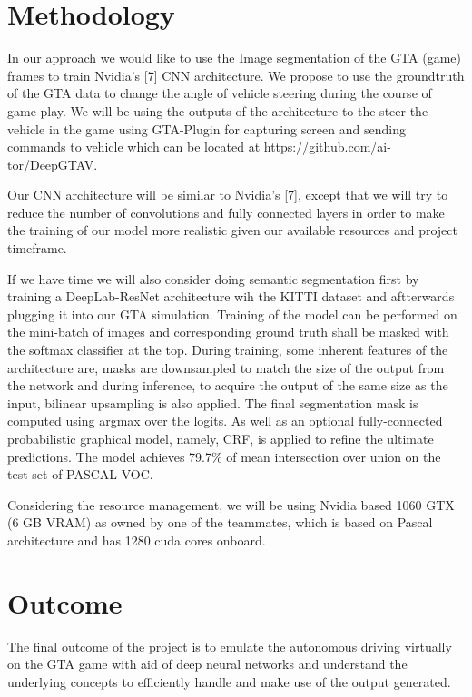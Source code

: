 \documentclass[10pt,twocolumn,letterpaper]{article}
\begin{document}
	\section{Methodology}
	In our approach we would like to use the Image segmentation of the GTA (game) frames to train Nvidia's [7] CNN architecture. We propose to use the groundtruth of the GTA data to change the angle of vehicle steering during the course of game play. We will be using the outputs of the architecture to the steer the vehicle in the game using GTA-Plugin for capturing screen and sending commands to vehicle which can be located at https://github.com/ai-tor/DeepGTAV.

	Our CNN architecture will be similar to Nvidia's [7], except that we will try to reduce the number of convolutions and fully connected layers in order to make the training of our model more realistic given our available resources and project timeframe.  
	
	If we have time we will also consider doing semantic segmentation first by training a DeepLab-ResNet architecture wih the KITTI dataset and aftterwards plugging it into our GTA simulation. Training of the model can be performed on the mini-batch of images and corresponding ground truth shall be masked with the softmax classifier at the top. During training, some inherent features of the architecture are, masks are downsampled to match the size of the output from the network and during inference, to acquire the output of the same size as the input, bilinear upsampling is also applied. The final segmentation mask is computed using argmax over the logits. As well as an optional fully-connected probabilistic graphical model, namely, CRF, is applied to refine the ultimate predictions. The model achieves 79.7\% of mean intersection over union on the test set of PASCAL VOC.
	
	Considering the resource management, we will be using Nvidia based 1060 GTX (6 GB VRAM) as owned by one of the teammates, which is based on Pascal architecture and has 1280 cuda cores onboard.
	
	\section{Outcome}
	The final outcome of the project is to emulate the autonomous driving virtually on the GTA game with aid of deep neural networks and understand the underlying concepts to efficiently handle and make use of the output generated.  
	
	
\end{document}
